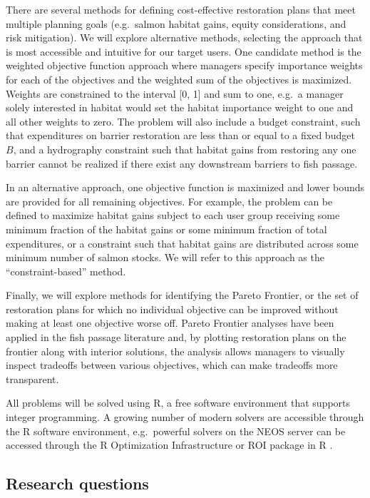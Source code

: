 There are several methods for defining cost-effective restoration plans that meet multiple planning goals (e.g.\ salmon habitat gains, equity considerations, and risk mitigation). We will explore alternative methods, selecting the approach that is most accessible and intuitive for our target users. One candidate method is the weighted objective function approach where managers specify importance weights for each of the objectives and the weighted sum of the objectives is maximized. Weights are constrained to the interval [0, 1] and sum to one, e.g.\ a manager solely interested in habitat would set the habitat importance weight to one and all other weights to zero. The problem will also include a budget constraint, such that expenditures on barrier restoration are less than or equal to a fixed budget $B$, and a hydrography constraint such that habitat gains from restoring any one barrier cannot be realized if there exist any downstream barriers to fish passage. 

In an alternative approach, one objective function is maximized and lower bounds are provided for all remaining objectives. For example, the problem can be defined to maximize habitat gains subject to each user group receiving some minimum fraction of the habitat gains or some minimum fraction of total expenditures, or a constraint such that habitat gains are distributed across some minimum number of salmon stocks. We will refer to this approach as the ``constraint-based'' method.

Finally, we will explore methods for identifying the Pareto Frontier, or the set of restoration plans for which no individual objective can be improved without making at least one objective worse off. Pareto Frontier analyses have been applied in the fish passage literature \citep[e.g.][]{couto_safeguarding_2021} and, by plotting restoration plans on the frontier along with interior solutions, the analysis allows managers to visually inspect tradeoffs between various objectives, which can make tradeoffs more transparent.

All problems will be solved using R, a free software environment that supports integer programming. A growing number of modern solvers are accessible through the R software environment, e.g.\ powerful solvers on the NEOS server can be accessed through the R Optimization Infrastructure or ROI package in R \citep{theussl2019roi}.

\subsection*{Research questions}

